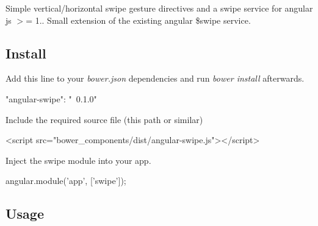 Simple vertical/horizontal swipe gesture directives and a swipe service for angular js $>$= 1.. Small extension of the existing angular \$swipe service.

\subsection*{Install}


\begin{DoxyItemize}
\item Add this line to your {\itshape bower.\+json} dependencies and run {\itshape bower install} afterwards.
\end{DoxyItemize}

\begin{quote}


\end{quote}

\begin{DoxyCode}
"angular-swipe": "~0.1.0"
\end{DoxyCode}



\begin{DoxyItemize}
\item Include the required source file (this path or similar)
\end{DoxyItemize}

\begin{quote}


\end{quote}

\begin{DoxyCode}
<script src="bower\_components/dist/angular-swipe.js"></script>
\end{DoxyCode}



\begin{DoxyItemize}
\item Inject the {\ttfamily swipe} module into your app.
\end{DoxyItemize}

\begin{quote}


\end{quote}

\begin{DoxyCode}
angular.module('app', ['swipe']);
\end{DoxyCode}


\subsection*{Usage}

